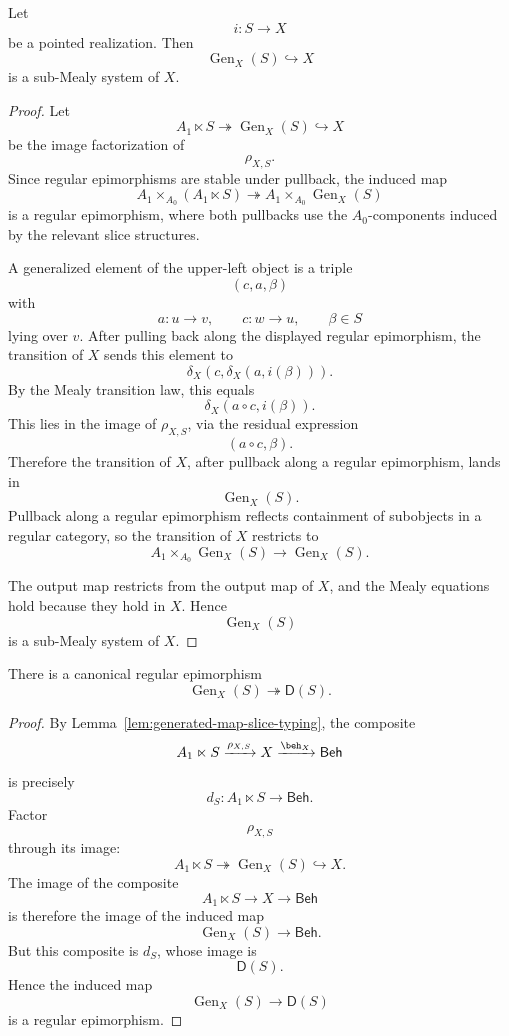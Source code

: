 \begin{proposition}
\label{prop:generated-part-submealy}
Let
\[
i:S\to X
\]
be a pointed realization. Then
\[
\operatorname{Gen}_X(S)\hookrightarrow X
\]
is a sub-Mealy system of \(X\).
\end{proposition}

\begin{proof}
Let
\[
A_1\ltimes S
\twoheadrightarrow
\operatorname{Gen}_X(S)
\hookrightarrow
X
\]
be the image factorization of
\[
\rho_{X,S}.
\]
Since regular epimorphisms are stable under pullback, the induced map
\[
A_1\times_{A_0}(A_1\ltimes S)
\twoheadrightarrow
A_1\times_{A_0}\operatorname{Gen}_X(S)
\]
is a regular epimorphism, where both pullbacks use the \(A_0\)-components
induced by the relevant slice structures.

A generalized element of the upper-left object is a triple
\[
(c,a,\beta)
\]
with
\[
a:u\to v,
\qquad
c:w\to u,
\qquad
\beta\in S
\]
lying over \(v\). After pulling back along the displayed regular epimorphism,
the transition of \(X\) sends this element to
\[
\delta_X(c,\delta_X(a,i(\beta))).
\]
By the Mealy transition law, this equals
\[
\delta_X(a\circ c,i(\beta)).
\]
This lies in the image of \(\rho_{X,S}\), via the residual expression
\[
(a\circ c,\beta).
\]
Therefore the transition of \(X\), after pullback along a regular epimorphism,
lands in
\[
\operatorname{Gen}_X(S).
\]
Pullback along a regular epimorphism reflects containment of subobjects in a
regular category, so the transition of \(X\) restricts to
\[
A_1\times_{A_0}\operatorname{Gen}_X(S)
\to
\operatorname{Gen}_X(S).
\]

The output map restricts from the output map of \(X\), and the Mealy equations
hold because they hold in \(X\). Hence
\[
\operatorname{Gen}_X(S)
\]
is a sub-Mealy system of \(X\).
\end{proof}

\begin{proposition}
\label{prop:generated-part-to-residual-closure}
There is a canonical regular epimorphism
\[
\operatorname{Gen}_X(S)
\twoheadrightarrow
\mathsf D(S).
\]
\end{proposition}

\begin{proof}
By Lemma~\ref{lem:generated-map-slice-typing}, the composite
\[
A_1\ltimes S
\xrightarrow{\rho_{X,S}}
X
\xrightarrow{\beh_X}
\mathsf{Beh}
\]
is precisely
\[
d_S:
A_1\ltimes S\to\mathsf{Beh}.
\]
Factor
\[
\rho_{X,S}
\]
through its image:
\[
A_1\ltimes S
\twoheadrightarrow
\operatorname{Gen}_X(S)
\hookrightarrow
X.
\]
The image of the composite
\[
A_1\ltimes S\to X\to\mathsf{Beh}
\]
is therefore the image of the induced map
\[
\operatorname{Gen}_X(S)\to\mathsf{Beh}.
\]
But this composite is \(d_S\), whose image is
\[
\mathsf D(S).
\]
Hence the induced map
\[
\operatorname{Gen}_X(S)\to\mathsf D(S)
\]
is a regular epimorphism.
\end{proof}

